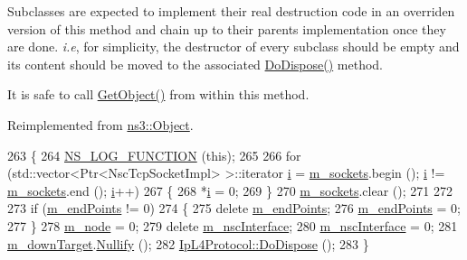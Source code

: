 Subclasses are expected to implement their real destruction code in an overriden version of this method and chain up to their parent\textquotesingle{}s implementation once they are done. {\itshape i.\+e}, for simplicity, the destructor of every subclass should be empty and its content should be moved to the associated \hyperlink{classns3_1_1NscTcpL4Protocol_ab3f77171a13c3e8f96717f26a6b716b9}{Do\+Dispose()} method.

It is safe to call \hyperlink{classns3_1_1Object_a13e18c00017096c8381eb651d5bd0783}{Get\+Object()} from within this method. 

Reimplemented from \hyperlink{classns3_1_1Object_a475d429a75d302d4775f4ae32479b287}{ns3\+::\+Object}.


\begin{DoxyCode}
263 \{
264   \hyperlink{log-macros-disabled_8h_a90b90d5bad1f39cb1b64923ea94c0761}{NS\_LOG\_FUNCTION} (\textcolor{keyword}{this});
265 
266   \textcolor{keywordflow}{for} (std::vector<Ptr<NscTcpSocketImpl> >::iterator \hyperlink{bernuolliDistribution_8m_a6f6ccfcf58b31cb6412107d9d5281426}{i} = \hyperlink{classns3_1_1NscTcpL4Protocol_ab8a0e5f53dffd3991f97dc7f886c0dc8}{m\_sockets}.begin (); 
      \hyperlink{bernuolliDistribution_8m_a6f6ccfcf58b31cb6412107d9d5281426}{i} != \hyperlink{classns3_1_1NscTcpL4Protocol_ab8a0e5f53dffd3991f97dc7f886c0dc8}{m\_sockets}.end (); \hyperlink{bernuolliDistribution_8m_a6f6ccfcf58b31cb6412107d9d5281426}{i}++)
267     \{
268       *\hyperlink{bernuolliDistribution_8m_a6f6ccfcf58b31cb6412107d9d5281426}{i} = 0;
269     \}
270   \hyperlink{classns3_1_1NscTcpL4Protocol_ab8a0e5f53dffd3991f97dc7f886c0dc8}{m\_sockets}.clear ();
271 
272 
273   \textcolor{keywordflow}{if} (\hyperlink{classns3_1_1NscTcpL4Protocol_a5cc20dcc5c7877b042c1179f11af6a90}{m\_endPoints} != 0)
274     \{
275       \textcolor{keyword}{delete} \hyperlink{classns3_1_1NscTcpL4Protocol_a5cc20dcc5c7877b042c1179f11af6a90}{m\_endPoints};
276       \hyperlink{classns3_1_1NscTcpL4Protocol_a5cc20dcc5c7877b042c1179f11af6a90}{m\_endPoints} = 0;
277     \}
278   \hyperlink{classns3_1_1NscTcpL4Protocol_a1a7121d0e0f775582e6b01a3e7bc1a6c}{m\_node} = 0;
279   \textcolor{keyword}{delete} \hyperlink{classns3_1_1NscTcpL4Protocol_aa73774a195b1e7d8ca31addef75e3454}{m\_nscInterface};
280   \hyperlink{classns3_1_1NscTcpL4Protocol_aa73774a195b1e7d8ca31addef75e3454}{m\_nscInterface} = 0;
281   \hyperlink{classns3_1_1NscTcpL4Protocol_a83227e4d5dbb352bb29edf0ee48a026e}{m\_downTarget}.\hyperlink{classns3_1_1Callback_ab24de4ac458fc5b1ac6f7a672c4c6cea}{Nullify} ();
282   \hyperlink{classns3_1_1Object_a475d429a75d302d4775f4ae32479b287}{IpL4Protocol::DoDispose} ();
283 \}
\end{DoxyCode}


